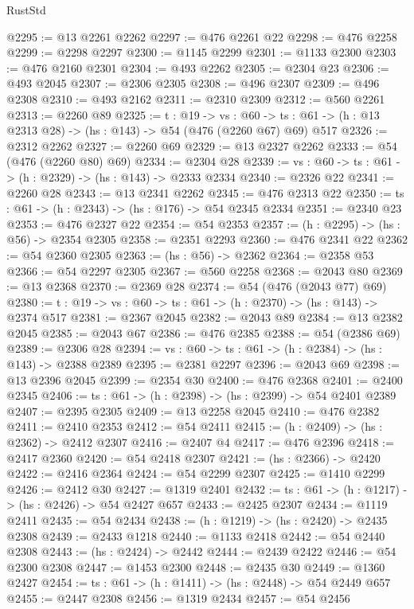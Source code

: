 \begin{lexlean}{RustStd}
\begin{coremodule}
@2295 := @13 @2261 @2262
@2297 := @476 @2261 @22
@2298 := @476 @2258
@2299 := @2298 @2297
@2300 := @1145 @2299
@2301 := @1133 @2300
@2303 := @476 @2160 @2301
@2304 := @493 @2262
@2305 := @2304 @23
@2306 := @493 @2045
@2307 := @2306 @2305
@2308 := @496 @2307
@2309 := @496 @2308
@2310 := @493 @2162
@2311 := @2310 @2309
@2312 := @560 @2261
@2313 := @2260 @89
@2325 := {t : @19} ->
  {vs : @60} -> {ts : @61} -> (h : @13 @2313 @28) -> (hs : @143) -> @54 (@476 (@2260 @67) @69) @517
@2326 := @2312 @2262
@2327 := @2260 @69
@2329 := @13 @2327 @2262
@2333 := @54 (@476 (@2260 @80) @69)
@2334 := @2304 @28
@2339 := {vs : @60} -> {ts : @61} -> (h : @2329) -> (hs : @143) -> @2333 @2334
@2340 := @2326 @22
@2341 := @2260 @28
@2343 := @13 @2341 @2262
@2345 := @476 @2313 @22
@2350 := {ts : @61} -> (h : @2343) -> (hs : @176) -> @54 @2345 @2334
@2351 := @2340 @23
@2353 := @476 @2327 @22
@2354 := @54 @2353
@2357 := (h : @2295) -> (hs : @56) -> @2354 @2305
@2358 := @2351 @2293
@2360 := @476 @2341 @22
@2362 := @54 @2360 @2305
@2363 := (hs : @56) -> @2362
@2364 := @2358 @53
@2366 := @54 @2297 @2305
@2367 := @560 @2258
@2368 := @2043 @80
@2369 := @13 @2368
@2370 := @2369 @28
@2374 := @54 (@476 (@2043 @77) @69)
@2380 := {t : @19} -> {vs : @60} -> {ts : @61} -> (h : @2370) -> (hs : @143) -> @2374 @517
@2381 := @2367 @2045
@2382 := @2043 @89
@2384 := @13 @2382 @2045
@2385 := @2043 @67
@2386 := @476 @2385
@2388 := @54 (@2386 @69)
@2389 := @2306 @28
@2394 := {vs : @60} -> {ts : @61} -> (h : @2384) -> (hs : @143) -> @2388 @2389
@2395 := @2381 @2297
@2396 := @2043 @69
@2398 := @13 @2396 @2045
@2399 := @2354 @30
@2400 := @476 @2368
@2401 := @2400 @2345
@2406 := {ts : @61} -> (h : @2398) -> (hs : @2399) -> @54 @2401 @2389
@2407 := @2395 @2305
@2409 := @13 @2258 @2045
@2410 := @476 @2382
@2411 := @2410 @2353
@2412 := @54 @2411
@2415 := (h : @2409) -> (hs : @2362) -> @2412 @2307
@2416 := @2407 @4
@2417 := @476 @2396
@2418 := @2417 @2360
@2420 := @54 @2418 @2307
@2421 := (hs : @2366) -> @2420
@2422 := @2416 @2364
@2424 := @54 @2299 @2307
@2425 := @1410 @2299
@2426 := @2412 @30
@2427 := @1319 @2401
@2432 := {ts : @61} -> (h : @1217) -> (hs : @2426) -> @54 @2427 @657
@2433 := @2425 @2307
@2434 := @1119 @2411
@2435 := @54 @2434
@2438 := (h : @1219) -> (hs : @2420) -> @2435 @2308
@2439 := @2433 @1218
@2440 := @1133 @2418
@2442 := @54 @2440 @2308
@2443 := (hs : @2424) -> @2442
@2444 := @2439 @2422
@2446 := @54 @2300 @2308
@2447 := @1453 @2300
@2448 := @2435 @30
@2449 := @1360 @2427
@2454 := {ts : @61} -> (h : @1411) -> (hs : @2448) -> @54 @2449 @657
@2455 := @2447 @2308
@2456 := @1319 @2434
@2457 := @54 @2456

\end{coremodule}
\end{lexlean}
